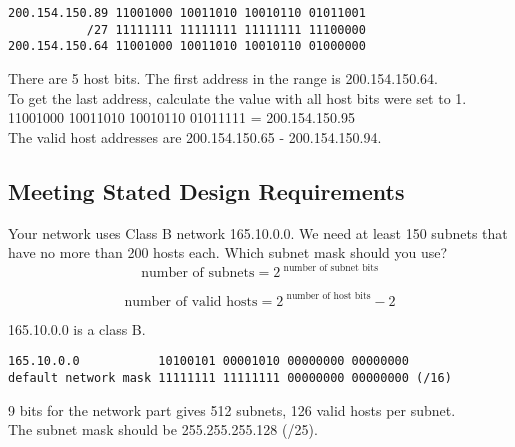 \begin{verbatim}
200.154.150.89 11001000 10011010 10010110 01011001
           /27 11111111 11111111 11111111 11100000
200.154.150.64 11001000 10011010 10010110 01000000
\end{verbatim}

There are 5 host bits. The first address in the range is 200.154.150.64.\\

To get the last address, calculate the value with all host bits were set to 1.\\

11001000 10011010 10010110 01011111 = 200.154.150.95\\

The valid host addresses are 200.154.150.65 - 200.154.150.94.

\subsection{Meeting Stated Design Requirements}

Your network uses Class B network 165.10.0.0. We need at least 150 subnets
that have no more than 200 hosts each. Which subnet mask should you use?\\

\begin{equation}
\mbox{number of subnets} = 2 ^{\mbox{ number of subnet bits}}
\end{equation}

\begin{equation}
\mbox{number of valid hosts} = 2 ^{\mbox{ number of host bits}} - 2
\end{equation}

165.10.0.0 is a class B.

\begin{verbatim}
165.10.0.0           10100101 00001010 00000000 00000000
default network mask 11111111 11111111 00000000 00000000 (/16)
\end{verbatim}

9 bits for the network part gives 512 subnets, 126 valid hosts per subnet.\\

The subnet mask should be 255.255.255.128 (/25).
